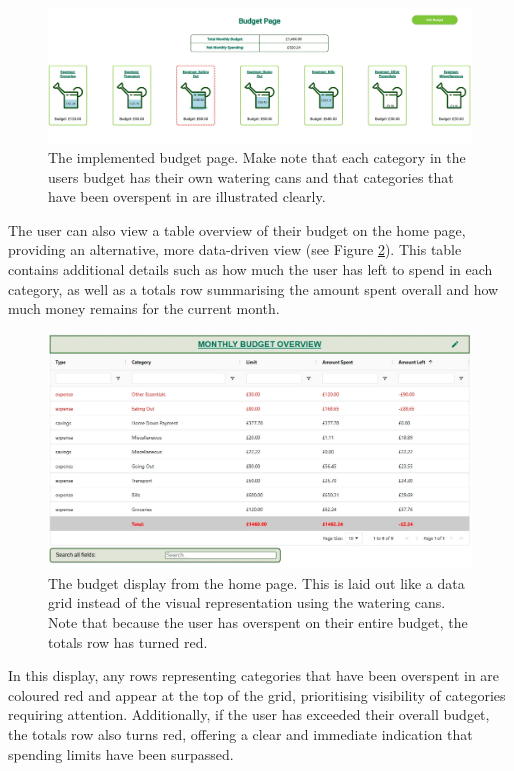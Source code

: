 \documentclass{l4proj}
\begin{document}
\begin{figure}[htb]
    \centering
    \includegraphics[width=0.75\linewidth]{images/UI-Screenshots/budget-page.png}
    \caption{The implemented budget page. Make note that each category in the users budget has their own watering cans and that categories that have been overspent in are illustrated clearly.}
    \label{fig:budget-page}
\end{figure}

The user can also view a table overview of their budget on the home page, providing an alternative, more data-driven view (see Figure \ref{fig:budget-table}). This table contains additional details such as how much the user has left to spend in each category, as well as a totals row summarising the amount spent overall and how much money remains for the current month.

\begin{figure}[htb]
    \centering
    \includegraphics[width=0.75\linewidth]{images/UI-Screenshots/budget-table.png}
    \caption{The budget display from the home page. This is laid out like a data grid instead of the visual representation using the watering cans. Note that because the user has overspent on their entire budget, the totals row has turned red.}
    \label{fig:budget-table}
\end{figure}

In this display, any rows representing categories that have been overspent in are coloured red and appear at the top of the grid, prioritising visibility of categories requiring attention. Additionally, if the user has exceeded their overall budget, the totals row also turns red, offering a clear and immediate indication that spending limits have been surpassed.
\end{document}
